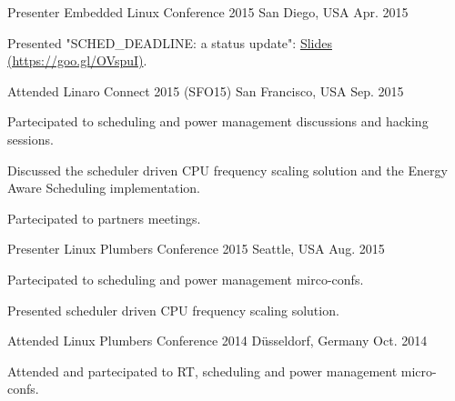 \begin{cventries}
  \cventry
    {Presenter} %
    {Embedded Linux Conference 2015} %
    {San Diego, USA} %
    {Apr. 2015} %
    {
      \begin{cvitems} %
        \item {Presented "SCHED\_DEADLINE: a status update":
	       \href{http://events.linuxfoundation.org/sites/events/files/slides/SCHED_DEADLINE-20160404.pdf}{Slides (https://goo.gl/OVspuI)}.}
      \end{cvitems}
    }

  \cventry
    {Attended} %
    {Linaro Connect 2015 (SFO15)} %
    {San Francisco, USA} %
    {Sep. 2015} %
    {
      \begin{cvitems} %
        \item {Partecipated to scheduling and power management discussions and
		hacking sessions.}
        \item {Discussed the scheduler driven CPU frequency scaling solution and
		the Energy Aware Scheduling implementation.}
        \item {Partecipated to partners meetings.}
      \end{cvitems}
    }

  \cventry
    {Presenter} %
    {Linux Plumbers Conference 2015} %
    {Seattle, USA} %
    {Aug. 2015} %
    {
      \begin{cvitems} %
        \item {Partecipated to scheduling and power management mirco-confs.}
        \item {Presented scheduler driven CPU frequency scaling solution.}
      \end{cvitems}
    }

  \cventry
    {Attended} %
    {Linux Plumbers Conference 2014} %
    {D\"{u}sseldorf, Germany} %
    {Oct. 2014} %
    {
      \begin{cvitems} %
        \item {Attended and partecipated to RT, scheduling and power management
		micro-confs.}
      \end{cvitems}
    }

%


\end{cventries}
